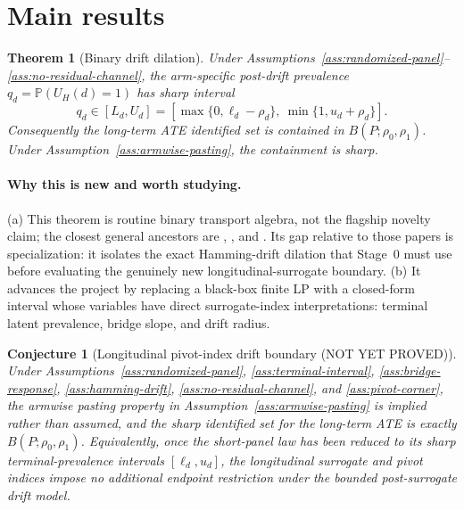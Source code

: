 \documentclass[11pt]{article}
\renewcommand{\Pr}{\mathbb{P}}
\theoremstyle{definition}
\theoremstyle{plain}
\newtheorem{theorem}{Theorem}
\newtheorem{conjecture}{Conjecture}
\theoremstyle{remark}
\begin{document}
\section{Main results}
\begin{theorem}[Binary drift dilation]\label{thm:binary-dilation}
Under Assumptions~\ref{ass:randomized-panel}--\ref{ass:no-residual-channel}, the arm-specific post-drift prevalence \(q_d=\Pr(U_H(d)=1)\) has sharp interval
\[
  q_d\in [L_d,U_d]
  =[\max\{0,\ell_d-\rho_d\},\ \min\{1,u_d+\rho_d\}].
\]
Consequently the long-term ATE identified set is contained in \(B(P;\rho_0,\rho_1)\).  Under Assumption~\ref{ass:armwise-pasting}, the containment is sharp.
\end{theorem}

\paragraph{Why this is new and worth studying.}
(a) This theorem is routine binary transport algebra, not the flagship novelty claim; the closest general ancestors are \citet{Manski1990}, \citet{BalkePearl1997}, and \citet{HuiWalter1980}.  Its gap relative to those papers is specialization: it isolates the exact Hamming-drift dilation that Stage~0 must use before evaluating the genuinely new longitudinal-surrogate boundary.  (b) It advances the project by replacing a black-box finite LP with a closed-form interval whose variables have direct surrogate-index interpretations: terminal latent prevalence, bridge slope, and drift radius.

\begin{conjecture}[Longitudinal pivot-index drift boundary (NOT YET PROVED)]\label{conj:pivot-boundary}
Under Assumptions~\ref{ass:randomized-panel}, \ref{ass:terminal-interval}, \ref{ass:bridge-response}, \ref{ass:hamming-drift}, \ref{ass:no-residual-channel}, and \ref{ass:pivot-corner}, the armwise pasting property in Assumption~\ref{ass:armwise-pasting} is implied rather than assumed, and the sharp identified set for the long-term ATE is exactly \(B(P;\rho_0,\rho_1)\).  Equivalently, once the short-panel law has been reduced to its sharp terminal-prevalence intervals \([\ell_d,u_d]\), the longitudinal surrogate and pivot indices impose no additional endpoint restriction under the bounded post-surrogate drift model.
\end{conjecture}
\end{document}
